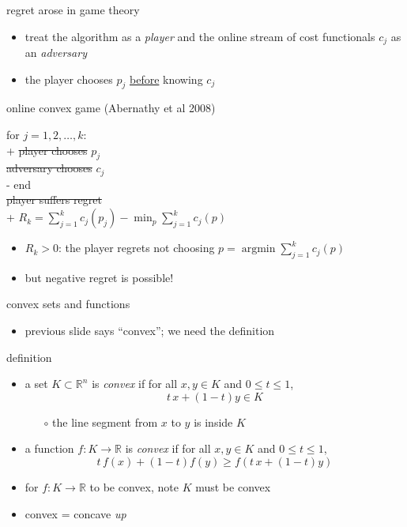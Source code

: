 \documentclass[xcolor={svgnames},
               hyperref={colorlinks,citecolor=DeepPink4,linkcolor=FireBrick,urlcolor=Maroon}]
               {beamer}
\newcommand{\RR}{\mathbb{R}}
\newcommand{\ds}{\displaystyle}
\begin{document}
\begin{frame}{regret arose in game theory}

\begin{itemize}
\item treat the algorithm as a \emph{player} and the online stream of cost functionals $c_j$ as an \emph{adversary}
\item the player chooses $p_j$ \underline{before} knowing $c_j$
\end{itemize}

\begin{block}{online convex game (Abernathy et al 2008)}
\begin{pseudo*}
for $j = 1,2,\dots,k$: \\+
    \st{player chooses} $p_{j}$ \\
    \st{adversary chooses} $c_{j}$ \\-
end \\
\st{player suffers regret} \\+
    $\ds R_k = \sum_{j=1}^k c_j(p_j) - \min_p \sum_{j=1}^k c_j(p)$
\end{pseudo*}
\end{block}

\begin{itemize}
\item $R_k>0$: the player regrets not choosing $p = \operatorname{argmin} \sum_{j=1}^k c_j(p)$
\item but negative regret is possible!
\end{itemize}
\end{frame}


\begin{frame}{convex sets and functions}

\begin{itemize}
\item previous slide says ``convex''; we need the definition
\end{itemize}

\begin{block}{definition}
\begin{itemize}
\item a set $K \subset \RR^n$ is \emph{convex} if for all $x,y \in K$ and $0 \le t \le 1$,
  $$t\, x + (1-t) y \in K$$

    \begin{itemize}
    \item[$\circ$] the line segment from $x$ to $y$ is inside $K$
    \end{itemize}
\item a function $f:K \to \RR$ is \emph{convex} if for all $x,y \in K$ and $0 \le t \le 1$,
  $$t\, f(x) + (1-t) f(y) \ge f(t\, x + (1-t) y)$$
\end{itemize}
\end{block}

\begin{itemize}
\item for $f:K\to \RR$ to be convex, note $K$ must be convex
\item convex = concave \emph{up}
\end{itemize}
\end{frame}
\end{document}
